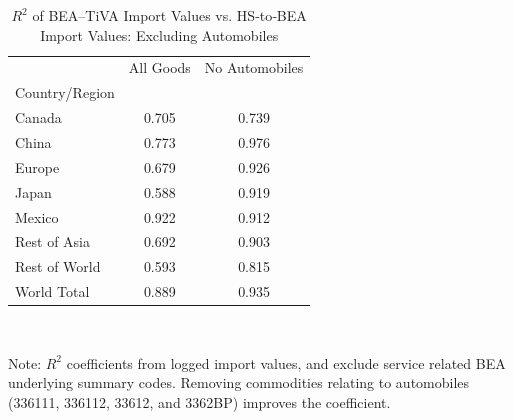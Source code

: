 \begin{table}[htbp]
\centering
\caption{$R^2$ of BEA--TiVA Import Values vs. HS‐to‐BEA Import Values: Excluding Automobiles}
\label{correlation_coefficent_regions}
\begin{tabular}{lcc}
\toprule
 & All Goods & No Automobiles \\
Country/Region &  &  \\
\midrule
Canada & 0.705 & 0.739 \\
China & 0.773 & 0.976 \\
Europe & 0.679 & 0.926 \\
Japan & 0.588 & 0.919 \\
Mexico & 0.922 & 0.912 \\
Rest of Asia & 0.692 & 0.903 \\
Rest of World & 0.593 & 0.815 \\
World Total & 0.889 & 0.935 \\
\bottomrule
\end{tabular}
\vspace{0.01cm}\\
\raggedright
{\scriptsize Note: $R^2$ coefficients from logged import values, and exclude service related BEA underlying summary codes. Removing commodities relating to automobiles (336111, 336112, 33612, and 3362BP) improves the coefficient.}

\end{table}
